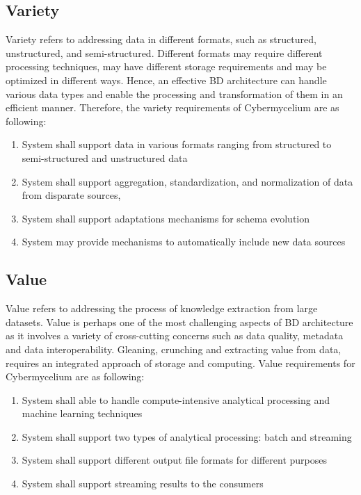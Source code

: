 \documentclass{bmcart}
\begin{document}
\subsection{Variety}

Variety refers to addressing data in different formats, such as structured, unstructured, and semi-structured. Different formats may require different processing techniques, may have different storage requirements and may be optimized in different ways. Hence, an effective BD architecture can handle various data types and enable the processing and transformation of them in an efficient manner. Therefore, the variety requirements of Cybermycelium are as following: 

\begin{enumerate}[label=\textbf{Var-\arabic*}]
    \item System shall support data in various formats ranging from structured to semi-structured and unstructured data
    \item System shall support aggregation, standardization, and normalization of data from disparate sources,
    \item System shall support adaptations mechanisms for schema evolution
    \item System may provide mechanisms to automatically include new data sources
\end{enumerate}


\subsection{Value}

Value refers to addressing the process of knowledge extraction from large datasets. Value is perhaps one of the most challenging aspects of BD architecture as it involves a variety of cross-cutting concerns such as data quality, metadata and data interoperability. Gleaning, crunching and extracting value from data, requires an integrated approach of storage and computing. Value requirements for Cybermycelium are as following:

\begin{enumerate}[label=\textbf{Val-\arabic*}]
    \item System shall able to handle compute-intensive analytical processing and machine learning techniques
    \item System shall support two types of analytical processing: batch and streaming
    \item System shall support different output file formats for different purposes
    \item System shall support streaming results to the consumers 
\end{enumerate}
\end{document}
